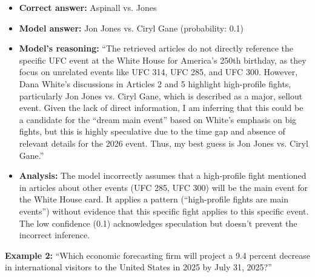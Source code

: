 \begin{itemize}
\item \textbf{Correct answer:} Aspinall vs. Jones
\item \textbf{Model answer:} Jon Jones vs. Ciryl Gane (probability: 0.1)
\item \textbf{Model's reasoning:} ``The retrieved articles do not directly reference the specific UFC event at the White House for America's 250th birthday, as they focus on unrelated events like UFC 314, UFC 285, and UFC 300. However, Dana White's discussions in Articles 2 and 5 highlight high-profile fights, particularly Jon Jones vs. Ciryl Gane, which is described as a major, sellout event. Given the lack of direct information, I am inferring that this could be a candidate for the ``dream main event'' based on White's emphasis on big fights, but this is highly speculative due to the time gap and absence of relevant details for the 2026 event. Thus, my best guess is Jon Jones vs. Ciryl Gane.''
\item \textbf{Analysis:} The model incorrectly assumes that a high-profile fight mentioned in articles about other events (UFC 285, UFC 300) will be the main event for the White House card. It applies a pattern (``high-profile fights are main events'') without evidence that this specific fight applies to this specific event. The low confidence (0.1) acknowledges speculation but doesn't prevent the incorrect inference.
\end{itemize}

\textbf{Example 2:} ``Which economic forecasting firm will project a 9.4 percent decrease in international visitors to the United States in 2025 by July 31, 2025?''

